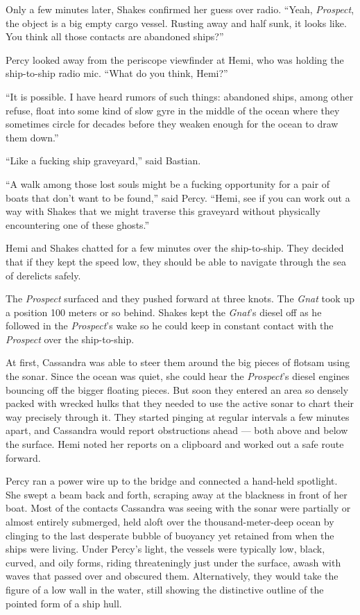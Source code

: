 \documentclass[
]{scrbook}
\begin{document}
Only a few minutes later, Shakes confirmed her guess over radio. ``Yeah,
\emph{Prospect}, the object is a big empty cargo vessel. Rusting away
and half sunk, it looks like. You think all those contacts are abandoned
ships?''

Percy looked away from the periscope viewfinder at Hemi, who was holding
the ship-to-ship radio mic. ``What do you think, Hemi?''

``It is possible. I have heard rumors of such things: abandoned ships,
among other refuse, float into some kind of slow gyre in the middle of
the ocean where they sometimes circle for decades before they weaken
enough for the ocean to draw them down.''

``Like a fucking ship graveyard,'' said Bastian.

``A walk among those lost souls might be a fucking opportunity for a
pair of boats that don't want to be found,'' said Percy. ``Hemi, see if
you can work out a way with Shakes that we might traverse this graveyard
without physically encountering one of these ghosts.''

Hemi and Shakes chatted for a few minutes over the ship-to-ship. They
decided that if they kept the speed low, they should be able to navigate
through the sea of derelicts safely.

The \emph{Prospect} surfaced and they pushed forward at three knots. The
\emph{Gnat} took up a position 100 meters or so behind. Shakes kept the
\emph{Gnat}'s diesel off as he followed in the \emph{Prospect}'s wake so
he could keep in constant contact with the \emph{Prospect} over the
ship-to-ship.

At first, Cassandra was able to steer them around the big pieces of
flotsam using the sonar. Since the ocean was quiet, she could hear the
\emph{Prospect}'s diesel engines bouncing off the bigger floating
pieces. But soon they entered an area so densely packed with wrecked
hulks that they needed to use the active sonar to chart their way
precisely through it. They started pinging at regular intervals a few
minutes apart, and Cassandra would report obstructions ahead --- both
above and below the surface. Hemi noted her reports on a clipboard and
worked out a safe route forward.

Percy ran a power wire up to the bridge and connected a hand-held
spotlight. She swept a beam back and forth, scraping away at the
blackness in front of her boat. Most of the contacts Cassandra was
seeing with the sonar were partially or almost entirely submerged, held
aloft over the thousand-meter-deep ocean by clinging to the last
desperate bubble of buoyancy yet retained from when the ships were
living. Under Percy's light, the vessels were typically low, black,
curved, and oily forms, riding threateningly just under the surface,
awash with waves that passed over and obscured them. Alternatively, they
would take the figure of a low wall in the water, still showing the
distinctive outline of the pointed form of a ship hull.
\end{document}
